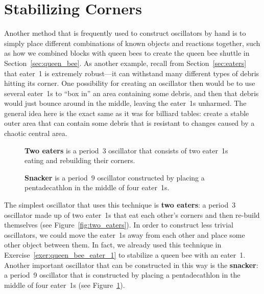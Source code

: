 \section{Stabilizing Corners}\label{sec:corner_oscillators}

Another method that is frequently used to construct oscillators by hand is to simply place different combinations of known objects and reactions together, such as how we combined blocks with queen bees to create the queen bee shuttle in Section~\ref{sec:queen_bee}. As another example, recall from Section~\ref{sec:eaters} that eater~1 is extremely robust---it can withstand many different types of debris hitting its corner. One possibility for creating an oscillator then would be to use several eater~1s to ``box in'' an area containing some debris, and then that debris would just bounce around in the middle, leaving the eater~1s unharmed. The general idea here is the exact same as it was for billiard tables: create a stable outer area that can contain some debris that is resistant to changes caused by a chaotic central area.

\begin{figure}[!htb]
	\centering
	\begin{minipage}{.48\textwidth}
		\centering
		\caption{\textbf{Two eaters} is a period~$3$ oscillator that consists of two eater~1s eating and rebuilding their corners.}\label{fig:two_eaters}
	\end{minipage} \hfill %
	\begin{minipage}{.48\textwidth}
		\centering
		\caption{\textbf{Snacker} is a period~$9$ oscillator constructed by placing a pentadecathlon in the middle of four eater~1s.}\label{fig:snacker}
	\end{minipage}
\end{figure}

The simplest oscillator that uses this technique is \textbf{two eaters}: a period~$3$ oscillator made up of two eater~1s that eat each other's corners and then re-build themselves (see Figure~\ref{fig:two_eaters}). In order to construct less trivial oscillators, we could move the eater~1s away from each other and place some other object between them. In fact, we already used this technique in Exercise~\ref{exer:queen_bee_eater_1} to stabilize a queen bee with an eater~1. Another important oscillator that can be constructed in this way is the \textbf{snacker}: a period~9 oscillator that is constructed by placing a pentadecathlon in the middle of four eater~1s (see Figure~\ref{fig:snacker}).

